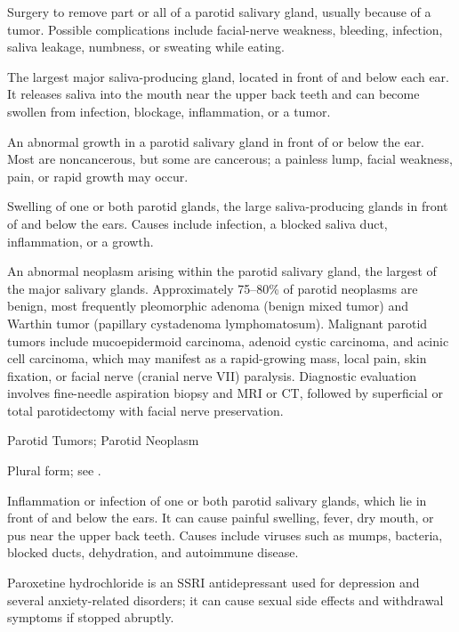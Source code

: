  Surgery to remove part or all of a parotid salivary gland, usually because of a tumor. Possible complications include facial-nerve weakness, bleeding, infection, saliva leakage, numbness, or sweating while eating.

 The largest major saliva-producing gland, located in front of and below each ear. It releases saliva into the mouth near the upper back teeth and can become swollen from infection, blockage, inflammation, or a tumor.

 An abnormal growth in a parotid salivary gland in front of or below the ear. Most are noncancerous, but some are cancerous; a painless lump, facial weakness, pain, or rapid growth may occur.

 Swelling of one or both parotid glands, the large saliva-producing glands in front of and below the ears. Causes include infection, a blocked saliva duct, inflammation, or a growth.

 An abnormal neoplasm arising within the parotid salivary gland, the largest of the major salivary glands. Approximately 75--80\% of parotid neoplasms are benign, most frequently pleomorphic adenoma (benign mixed tumor) and Warthin tumor (papillary cystadenoma lymphomatosum). Malignant parotid tumors include mucoepidermoid carcinoma, adenoid cystic carcinoma, and acinic cell carcinoma, which may manifest as a rapid-growing mass, local pain, skin fixation, or facial nerve (cranial nerve VII) paralysis. Diagnostic evaluation involves fine-needle aspiration biopsy and MRI or CT, followed by superficial or total parotidectomy with facial nerve preservation.

\synonyms
Parotid Tumors; Parotid Neoplasm

 Plural form; see .

 Inflammation or infection of one or both parotid salivary glands, which lie in front of and below the ears. It can cause painful swelling, fever, dry mouth, or pus near the upper back teeth. Causes include viruses such as mumps, bacteria, blocked ducts, dehydration, and autoimmune disease.

 Paroxetine hydrochloride is an SSRI antidepressant used for depression and several anxiety-related disorders; it can cause sexual side effects and withdrawal symptoms if stopped abruptly.

